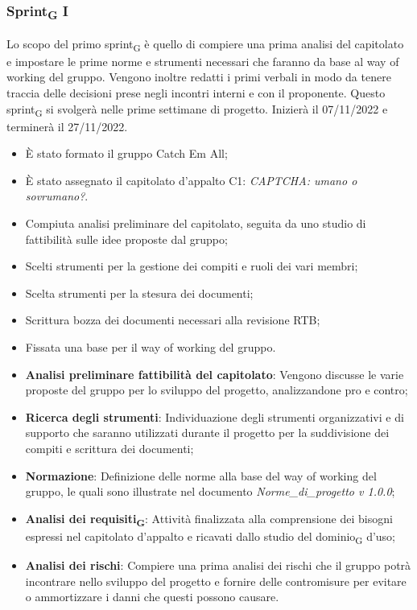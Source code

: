 \subsubsection{Sprint\textsubscript{G} I}
Lo scopo del primo sprint\textsubscript{G} è quello di compiere una prima analisi del capitolato e impostare le prime norme e strumenti necessari che faranno da base al way of working del gruppo. Vengono inoltre redatti i primi verbali in modo da tenere traccia delle decisioni prese negli incontri interni e con il proponente.
Questo sprint\textsubscript{G} si svolgerà nelle prime settimane di progetto. Inizierà il 07/11/2022 e terminerà il 27/11/2022.

\:
\begin{itemize}
	\item È stato formato il gruppo Catch Em All;
	\item È stato assegnato il capitolato d’appalto C1: \textit{CAPTCHA: umano o sovrumano?}.
\end{itemize}

\:
\begin{itemize}
	\item Compiuta analisi preliminare del capitolato, seguita da uno studio di fattibilità sulle idee proposte dal gruppo;
	\item Scelti strumenti per la gestione dei compiti e ruoli dei vari membri;
	\item Scelta strumenti per la stesura dei documenti;
	\item Scrittura bozza dei documenti necessari alla revisione RTB;
	\item Fissata una base per il way of working del gruppo.
\end{itemize}

\:
\begin{itemize}
	\item \textbf{Analisi preliminare fattibilità del capitolato}: Vengono discusse le varie proposte del gruppo per lo sviluppo del progetto, analizzandone pro e contro;
	\item \textbf{Ricerca degli strumenti}: Individuazione degli strumenti organizzativi e di supporto che saranno utilizzati durante il progetto per la suddivisione dei compiti e scrittura dei documenti;
	\item \textbf{Normazione}: Definizione delle norme alla base del way of working del gruppo, le quali sono illustrate nel documento \textit{Norme\_di\_progetto v 1.0.0};
    \item \textbf{Analisi dei requisiti\textsubscript{G}}: Attività finalizzata alla comprensione dei bisogni espressi nel capitolato d’appalto e ricavati dallo studio del dominio\textsubscript{G} d’uso;
    \item \textbf{Analisi dei rischi}: Compiere una prima analisi dei rischi che il gruppo potrà incontrare nello sviluppo del progetto e fornire delle contromisure per evitare o ammortizzare i danni che questi possono causare.
\end{itemize}
\newpage
